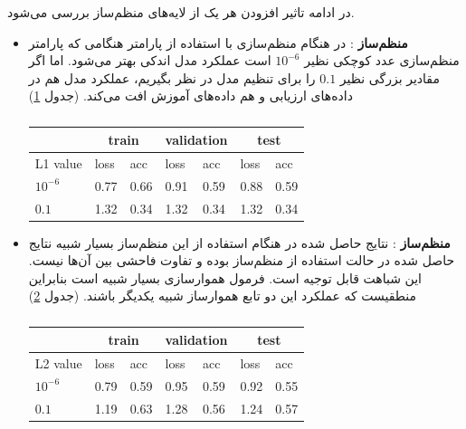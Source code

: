 \documentclass[12pt, a4paper]{article}
\begin{document}
در ادامه تاثیر افزودن هر یک از لایه‌های منظم‌ساز بررسی می‌شود.

\begin{itemize}
    \item \textbf{منظم‌ساز }: در هنگام منظم‌سازی با استفاده از پارامتر  هنگامی که پارامتر
    منظم‌سازی عدد کوچکی نظیر $10^{-6}$ است عملکرد مدل اندکی بهتر می‌شود.
    اما اگر مقادیر بزرگی نظیر $0.1$ را برای تنظیم مدل در نظر بگیریم، عملکرد مدل هم در داده‌های
    ارزیابی و هم داده‌های آموزش افت می‌کند. (جدول \ref{lenet_l1_reg})
    \begin{latin}
    \begin{table}[h]
        \centering
        \caption{}
        \label{lenet_l1_reg}
        \begin{tabular}{l|l|l||l|l||l|l}
            & \multicolumn{2}{c||}{train} & \multicolumn{2}{c||}{validation} & \multicolumn{2}{c}{test} \\ \hline
            L1 value & loss & acc & loss & acc & loss & acc\\ \hline
            $10^{-6}$ & 0.77 & 0.66 & 0.91 & 0.59 & 0.88 & 0.59\\
            $0.1$ & 1.32 & 0.34 & 1.32 & 0.34 & 1.32 & 0.34
        \end{tabular}
    \end{table}
    \end{latin}
    \item \textbf{منظم‌ساز }: نتایج حاصل شده در هنگام استفاده از این منظم‌ساز بسیار شبیه نتایج حاصل شده در حالت استفاده
    از منظم‌ساز  بوده و تفاوت فاحشی بین آن‌ها نیست.
    این شباهت قابل توجیه است. فرمول هموار‌سازی  بسیار شبیه  است
    بنابراین منطقیست که عملکرد این دو تابع هموار‌ساز شبیه یکدیگر باشند. (جدول \ref{lenet_l2_reg})
    \begin{latin}
    \begin{table}[h]
        \centering
        \caption{}
        \label{lenet_l2_reg}
        \begin{tabular}{l|l|l||l|l||l|l}
            & \multicolumn{2}{c||}{train} & \multicolumn{2}{c||}{validation} & \multicolumn{2}{c}{test} \\ \hline
            L2 value & loss & acc & loss & acc & loss & acc\\ \hline
            $10^{-6}$ & 0.79 & 0.59 & 0.95 & 0.59 & 0.92 & 0.55 \\
            $0.1$ & 1.19 & 0.63 & 1.28 & 0.56 & 1.24 & 0.57
        \end{tabular}
    \end{table}
    \end{latin}


\end{itemize}
\end{document}
